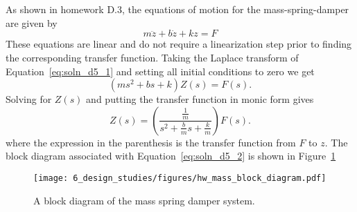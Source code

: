 
As shown in homework D.3, the equations of motion for the mass-spring-damper are given by 
\begin{equation}\label{eq:soln_d5_1}
m\ddot{z} + b\dot{z} + kz = F 
\end{equation}
These equations are linear and do not require a linearization step prior to finding the corresponding transfer function.
Taking the Laplace transform of Equation~\eqref{eq:soln_d5_1} and setting all initial conditions to zero we get
\[
(ms^2 + bs + k) Z(s) = F(s).
\]
Solving for $Z(s)$ and putting the transfer function in monic form gives
\begin{equation}\label{eq:soln_d5_2}
Z(s) = \left(\frac{\frac{1}{m}}{s^2 + \frac{b}{m}s + \frac{k}{m}}\right) F(s).
\end{equation}
where the expression in the parenthesis is the transfer function from $F$ to $z$. The block diagram associated with Equation~\eqref{eq:soln_d5_2} is shown in Figure~\ref{fig:hw_mass_block_diagram}
\begin{figure}[htbp]
   \centering
   \texttt{[image: 6\_design\_studies/figures/hw\_mass\_block\_diagram.pdf]}
   \caption{A block diagram of the mass spring damper system.}
   \label{fig:hw_mass_block_diagram}
\end{figure} 
